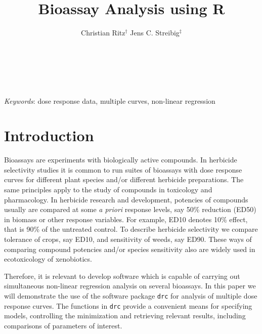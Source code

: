 \documentclass[a4paper]{article}
\begin{document}

\title{Bioassay Analysis using \textbf{R}}
\author{\hfill Christian Ritz$^\dag$ \hfill Jens C. Streibig$^\ddag$ \hfill \hfill \\
\\
}

\maketitle

\\
\\
\emph{Keywords}: dose response data, multiple curves, non-linear regression


\section{Introduction} 

Bioassays are experiments with biologically active compounds.
In herbicide selectivity studies it is
common to run suites of bioassays with dose response curves for
different plant species and/or different herbicide preparations.
The same principles apply to the study of compounds in toxicology
and pharmacology. In herbicide research and development, potencies of compounds usually are
compared at some \emph{a priori} response
levels, say 50\% reduction (ED50) in biomass or other response
variables. For example, ED10 denotes 10\% effect, that is 90\% of the untreated control.
To describe herbicide selectivity we compare
tolerance of crops, say ED10, and sensitivity of
weeds, say ED90. These ways of comparing compound potencies and/or
species sensitivity also are widely used in ecotoxicology of
xenobiotics.

Therefore, it is relevant to develop software which is capable of
carrying out simultaneous non-linear regression analysis on
several bioassays. In this paper we will demonstrate the use of
the software package \verb+drc+ for analysis of multiple
dose response curves. The functions in \verb+drc+ provide a convenient means for specifying
models, controlling the minimization and retrieving relevant
results, including comparisons of parameters of interest.
\end{document}
